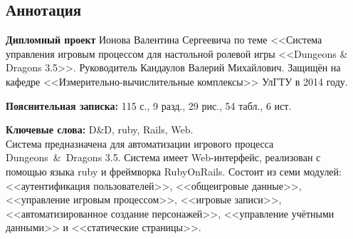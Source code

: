 \begin{titlepage}


\section*{Аннотация}
\noindent\textbf{Дипломный проект} Ионова Валентина Сергеевича по теме <<Система управления игровым процессом для настольной ролевой игры <<Dungeons \& Dragons 3.5>>.
Руководитель Кандаулов Валерий Михайлович. Защищён на кафедре <<Измерительно-вычислительные комплексы>> УлГТУ в 2014 году.

\noindent\textbf{Пояснительная записка:} 115 с., 9 разд., 29 рис., 54 табл., 6 ист.

\noindent\textbf{Ключевые слова:} D\&D, ruby, Rails, Web.\\[1cm]
\noindent Система предназначена для автоматизации игрового процесса Dungeons~\&~Dragons 3.5. Система имеет Web-интерфейс, реализован с помощью языка ruby и фреймворка RubyOnRails. Состоит из семи модулей: <<аутентификация пользователей>>, <<общеигровые данные>>, <<управление игровым процессом>>, <<игровые записи>>, <<автоматизированное создание персонажей>>, <<управление учётными данными>> и <<статические страницы>>.

\end{titlepage}

\restoregeometry
